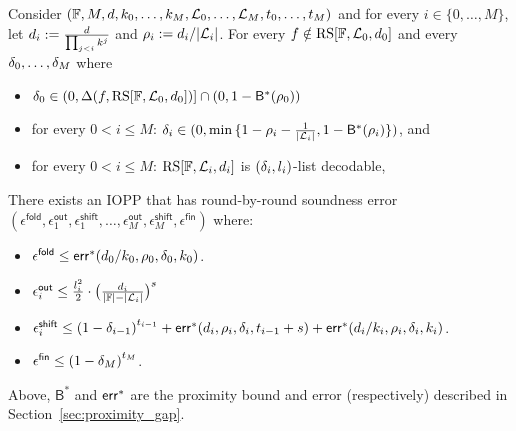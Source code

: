 \begin{lemma}\label{lemma:rnd_by_rnd_soundness}
    Consider $(\mathbb{F},M,d,k_0,\ldots,k_M,\mathcal{L}_0,\ldots,\mathcal{L}_M,t_0,\ldots,t_M)$ and for every $i\in\{0,\ldots,M\}$, let $d_i:=\frac{d}{\prod_{j<i}k^j}$ and $\rho_i:=d_i/|\mathcal{L}_i|$. For every $f\notin\mathrm{RS}[\mathbb{F},\mathcal{L}_0,d_0]$ and every $\delta_0,\ldots,\delta_M$ where
    \begin{itemize}
        \item $\delta_0\in(0,\Delta(f,\mathrm{RS}[\mathbb{F},\mathcal{L}_0,d_0])]\cap(0,1-{\mathsf{B}}^*(\rho_0))$
        \item for every $0<i\leq M$: $\delta_i\in(0,\min{\{1-\rho_i-\frac{1}{|\mathcal{L}_i|},1-{\mathsf{B}^*(\rho_i)}\}})$, and
        \item for every $0<i\leq M$: $\mathrm{RS}[\mathbb{F},\mathcal{L}_i,d_i]$ is $(\delta_i,l_i)$-list decodable,
    \end{itemize}
    There exists an IOPP that has round-by-round soundness error $(\epsilon^{\mathsf{fold}},\epsilon^{\mathsf{out}}_1,\epsilon^{\mathsf{shift}}_1,\ldots,\epsilon^{\mathsf{out}}_M,\epsilon^{\mathsf{shift}}_M,\epsilon^{\mathsf{fin}})$ where:
    \begin{itemize}
        \item $\epsilon^{\mathsf{fold}}\leq\mathsf{err}^*(d_0/k_0,\rho_0,\delta_0,k_0)$.
        \item $\epsilon^{\mathsf{out}}_i\leq\frac{l^2_i}{2}\cdot{\big(\frac{d_i}{|\mathbb{F}|-|\mathcal{L}_i|}\big)}^s$
        \item $\epsilon^{\mathsf{shift}}_i\leq {(1-\delta_{i-1})}^{t_{i-1}}+\mathsf{err}^*(d_i,\rho_i,\delta_i,t_{i-1}+s)+\mathsf{err}^*(d_i/k_i,\rho_i,\delta_i,k_i)$.
        \item $\epsilon^{\mathsf{fin}}\leq{(1-\delta_M)}^{t_M}$.
    \end{itemize}
    Above, ${\mathsf{B}}^*$ and ${\mathsf{err}}^*$ are the proximity bound and error (respectively) described in Section~\ref{sec:proximity_gap}.
\end{lemma}


